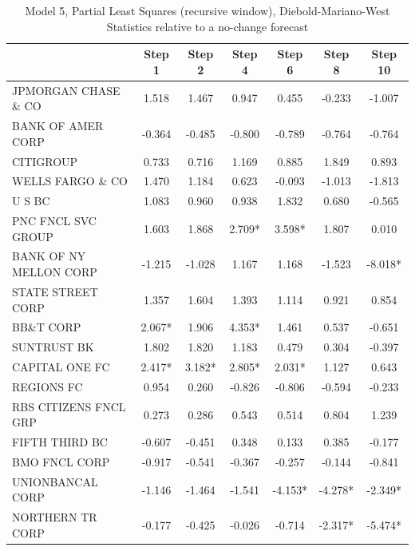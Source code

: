 \documentclass[11pt]{article}
\begin{document}
\begin{table}
\caption{Model 5, Partial Least Squares (recursive window), Diebold-Mariano-West Statistics relative to a no-change forecast}                                                       
                                                        
\center                                                              
\begin{tabular}{|l|c|c|c|c|c|c|}                                     
\hline                                                               
&Step 1 &Step 2 &Step 4 &Step 6 &Step 8 &Step 10\\                   
\hline                                                               
JPMORGAN CHASE \& CO  &1.518&1.467&0.947&0.455&-0.233&-1.007\\       
BANK OF AMER CORP     &-0.364&-0.485&-0.800&-0.789&-0.764&-0.764\\   
CITIGROUP             &0.733&0.716&1.169&0.885&1.849&0.893\\         
WELLS FARGO \& CO     &1.470&1.184&0.623&-0.093&-1.013&-1.813\\      
U S BC                &1.083&0.960&0.938&1.832&0.680&-0.565\\        
PNC FNCL SVC GROUP    &1.603&1.868&2.709*&3.598*&1.807&0.010\\       
BANK OF NY MELLON CORP&-1.215&-1.028&1.167&1.168&-1.523&-8.018*\\    
STATE STREET CORP     &1.357&1.604&1.393&1.114&0.921&0.854\\         
BB\&T CORP            &2.067*&1.906&4.353*&1.461&0.537&-0.651\\      
SUNTRUST BK           &1.802&1.820&1.183&0.479&0.304&-0.397\\        
CAPITAL ONE FC        &2.417*&3.182*&2.805*&2.031*&1.127&0.643\\     
REGIONS FC            &0.954&0.260&-0.826&-0.806&-0.594&-0.233\\     
RBS CITIZENS FNCL GRP &0.273&0.286&0.543&0.514&0.804&1.239\\         
FIFTH THIRD BC        &-0.607&-0.451&0.348&0.133&0.385&-0.177\\      
BMO FNCL CORP         &-0.917&-0.541&-0.367&-0.257&-0.144&-0.841\\   
UNIONBANCAL CORP      &-1.146&-1.464&-1.541&-4.153*&-4.278*&-2.349*\\
NORTHERN TR CORP      &-0.177&-0.425&-0.026&-0.714&-2.317*&-5.474*\\ 

\end{tabular}
\end{table}
\end{document}
